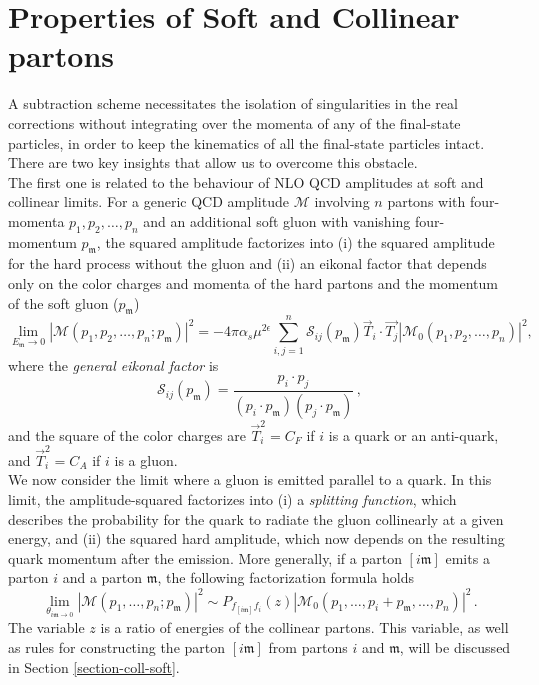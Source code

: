 \documentclass[a4paper, 12pt]{book}
\newcommand{\um}{\mathfrak{m}}
\begin{document}
\section{Properties of Soft and Collinear partons}
\label{properties}
A subtraction scheme necessitates the isolation of singularities in the real corrections without integrating over the momenta of any of the final-state particles, in order to keep the kinematics of all the final-state particles intact. There are two key insights that allow us to overcome this obstacle. \\ The first one is related to the behaviour of NLO QCD amplitudes at soft and collinear limits. For a generic QCD amplitude $\mathcal{M}$ involving $n$ partons with four-momenta $p_1, p_2, \dots, p_n$ and an additional soft gluon with vanishing four-momentum $p_\um$, the squared amplitude factorizes into (i) the squared amplitude for the hard process without the gluon and (ii) an eikonal factor that depends only on the color charges and momenta of the hard partons and the momentum of the soft gluon ($p_\um$) \cite{Catani:1999ss}
\begin{equation}
    \lim_{E_\um \rightarrow 0}|\mathcal{M}(p_1, p_2, \dots, p_n; p_\um)|^2= - 4\pi \alpha_s \mu^{2\epsilon} \sum_{i,j=1}^n \mathcal{S}_{ij}(p_\um) \vec{T}_i \cdot \vec{T_j} |\mathcal{M}_0(p_1, p_2, \dots, p_n)|^2,
    \label{ampl-soft}
\end{equation}
where the \emph{general eikonal factor} is
\begin{equation}
    \mathcal{S}_{ij}(p_\um) = \frac{p_i \cdot p_j}{(p_i \cdot p_\um)(p_j \cdot p_\um)}  \,, 
    \label{eikonal}
\end{equation}
and the square of the color charges are $\vec{T}_i^2= C_F$ if $i$ is a quark or an anti-quark, and $\vec{T}_i^2= C_A$ if $i$ is a gluon. \\

We now consider the limit where a gluon is emitted parallel to a quark. In this limit, the amplitude-squared factorizes into (i) a \emph{splitting function}, which describes the probability for the quark to radiate the gluon collinearly at a given energy, and (ii) the squared hard amplitude, which now depends on the resulting quark momentum after the emission. More generally, if a parton $[i\um]$ emits a parton $i$ and a parton $\um$, the following factorization formula holds
\begin{equation}
    \lim_{\theta_{i \um \rightarrow 0}}|\mathcal{M}(p_1, \dots, p_n; p_\um)|^2 \sim P_{f_{[i\um]}f_i} (z) |\mathcal{M}_0(p_1, \dots , p_i + p_\um, \dots, p_n)|^2  \,.
    \label{ampl-coll}
\end{equation}
The variable $z$ is a ratio of energies of the collinear partons. This variable, as well as rules for constructing the parton $[i\um]$ from partons $i$ and $\um$, will be discussed in Section \ref{section-coll-soft}. \\
\end{document}
